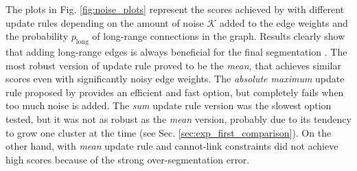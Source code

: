 The plots in Fig. \ref{fig:noise_plots} represent the scores achieved by \algname{} with different update rules depending on the amount of noise $\mathcal{K}$ added to the edge weights and the probability $p_{\mathrm{long}}$ of long-range connections in the graph. Results clearly show that adding long-range edges is always beneficial for the final segmentation .  The most robust version of update rule proved to be the \emph{mean}, that achieves similar scores even with significantly noisy edge weights. The \emph{absolute maximum} update rule proposed by \cite{wolf2018mutex} provides an efficient and fast option, but completely fails when too much noise is added. 
The \emph{sum} update rule version was the slowest option tested, but it was not as robust as the \emph{mean} version, probably due to its tendency to grow one cluster at the time (see Sec. \ref{sec:exp_first_comparison}). 
On the other hand, \algname{} with \emph{mean} update rule and cannot-link constraints did not achieve high scores because of the strong over-segmentation error.



